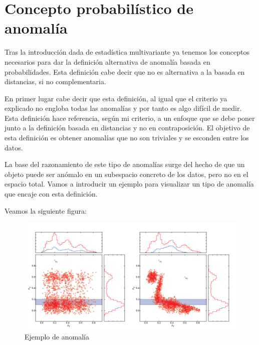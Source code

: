 \chapter{Concepto probabilístico de anomalía}
\label{chapter:anomalia_probabilidad}

Tras la introducción dada de estadística multivariante ya tenemos los conceptos necesarios para dar la definición alternativa de anomalía basada en probabilidades. Esta definición cabe decir que no es alternativa a la basada en distancias, si no complementaria.

En primer lugar cabe decir que esta definición, al igual que el criterio ya explicado no engloba todas las anomalías y por tanto es algo difícil de medir. Esta definición hace referencia, según mi criterio, a un enfoque que se debe poner junto a la definición basada en distancias y no en contraposición. El objetivo de esta definición es obtener anomalías que no son triviales y se esconden entre los datos.

La base del razonamiento de este tipo de anomalías surge del hecho de que un objeto puede ser anómalo en un subespacio concreto de los datos, pero no en el espacio total. Vamos a introducir un ejemplo para visualizar un tipo de anomalía que encaje con esta definición.

Veamos la siguiente figura:

\begin{figure}[H]
	\centering
	\label{ejemplo_anomalia_probabilidad}
	\includegraphics[scale=0.6]{imagenes/ejemplo_anomalia_probabilidad}
	\caption{Ejemplo de anomalía \cite{fabian_keller_hics:_2012}}
\end{figure}

